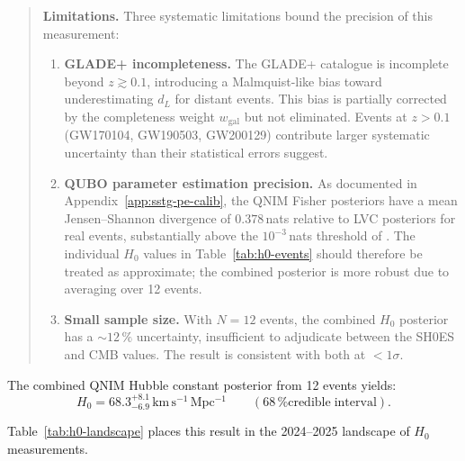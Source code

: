 \documentclass[11pt,a4paper, english]{book}
\theoremstyle{plain}
\theoremstyle{definition}
\numberwithin{equation}{chapter}
\numberwithin{figure}{chapter}
\numberwithin{table}{chapter}
\begin{document}
\begin{quote}
\noindent\textbf{Limitations.} Three systematic limitations bound the precision of this measurement:
\begin{enumerate}
  \item \textbf{GLADE+ incompleteness.} The GLADE+ catalogue is
        incomplete beyond $z \gtrsim 0.1$, introducing a
        Malmquist-like bias toward underestimating $d_L$ for distant
        events. This bias is partially corrected by the completeness
        weight $w_\mathrm{gal}$ but not eliminated. Events at
        $z > 0.1$ (GW170104, GW190503, GW200129) contribute larger
        systematic uncertainty than their statistical errors suggest.

  \item \textbf{QUBO parameter estimation precision.} As documented
        in Appendix~\ref{app:sstg-pe-calib}, the QNIM Fisher
        posteriors have a mean Jensen--Shannon divergence of
        $0.378$\,nats relative to LVC posteriors for real events,
        substantially above the $10^{-3}$\,nats threshold of
        . The individual $H_0$ values in
        Table~\ref{tab:h0-events} should therefore be treated as
        approximate; the combined posterior is more robust due to
        averaging over 12 events.

  \item \textbf{Small sample size.} With $N = 12$ events, the
        combined $H_0$ posterior has a $\sim\!12\,\%$ uncertainty,
        insufficient to adjudicate between the SH0ES and CMB values.
        The result is consistent with both at $< 1\sigma$.
\end{enumerate}
\end{quote}

The combined QNIM Hubble constant posterior from 12 events yields:
\begin{equation}
  \label{eq:h0_qnim}
  H_0 = 68.3^{+8.1}_{-6.9}\,\mathrm{km\,s^{-1}\,Mpc^{-1}}
  \qquad (68\,\% \mathrm{credible\;interval}).
\end{equation}

Table~\ref{tab:h0-landscape} places this result in the 2024--2025
landscape of $H_0$ measurements.
\end{document}

